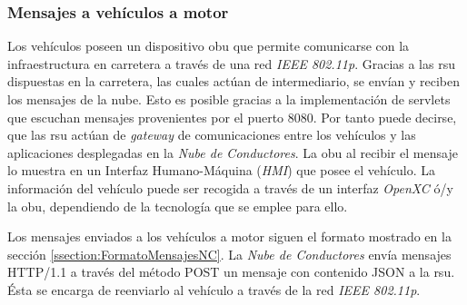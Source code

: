 \subsubsection{Mensajes a vehículos a motor}\label{sssection:mensajesvehiculomotor}
Los vehículos poseen un dispositivo \gls{obu} que permite comunicarse con la infraestructura en carretera a través de una red \emph{IEEE 802.11p}. Gracias a las \gls{rsu} dispuestas en la carretera, las cuales actúan de intermediario, se envían y reciben los mensajes de la nube. Esto es posible gracias a la implementación de servlets que escuchan mensajes provenientes por el puerto 8080. Por tanto puede decirse, que las \gls{rsu} actúan de \emph{gateway} de comunicaciones entre los vehículos y las aplicaciones desplegadas en la \emph{Nube de Conductores}. La \gls{obu} al recibir el mensaje lo muestra en un Interfaz Humano-Máquina (\emph{HMI}) que posee el vehículo. La información del vehículo puede ser recogida a través de un interfaz \emph{OpenXC} ó/y la \gls{obu}, dependiendo de la tecnología que se emplee para ello.

Los mensajes enviados a los vehículos a motor siguen el formato mostrado en la sección \ref{ssection:FormatoMensajesNC}. La \emph{Nube de Conductores} envía mensajes HTTP/1.1 a través del método POST un mensaje con contenido JSON a la \gls{rsu}. Ésta se encarga de reenviarlo al vehículo a través de la red \emph{IEEE 802.11p}.

